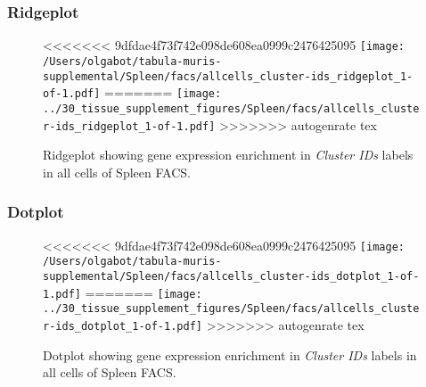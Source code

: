 \clearpage

\subsubsection{Ridgeplot}
\begin{figure}[h]
\centering
<<<<<<< 9dfdae4f73f742e098de608ea0999c2476425095
\texttt{[image: /Users/olgabot/tabula-muris-supplemental/Spleen/facs/allcells\_cluster-ids\_ridgeplot\_1-of-1.pdf]}
=======
\texttt{[image: ../30\_tissue\_supplement\_figures/Spleen/facs/allcells\_cluster-ids\_ridgeplot\_1-of-1.pdf]}
>>>>>>> autogenrate tex

\caption{ Ridgeplot  showing gene expression enrichment in \emph{Cluster IDs} labels in all cells of Spleen FACS. }
\end{figure}


\clearpage

\subsubsection{Dotplot}
\begin{figure}[h]
\centering
<<<<<<< 9dfdae4f73f742e098de608ea0999c2476425095
\texttt{[image: /Users/olgabot/tabula-muris-supplemental/Spleen/facs/allcells\_cluster-ids\_dotplot\_1-of-1.pdf]}
=======
\texttt{[image: ../30\_tissue\_supplement\_figures/Spleen/facs/allcells\_cluster-ids\_dotplot\_1-of-1.pdf]}
>>>>>>> autogenrate tex

\caption{ Dotplot  showing gene expression enrichment in \emph{Cluster IDs} labels in all cells of Spleen FACS. }
\end{figure}

